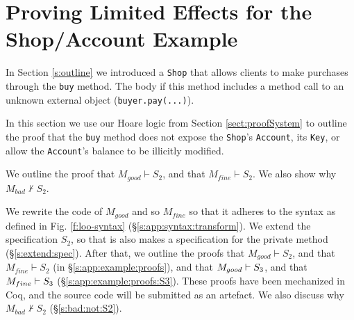 \newcommand{\STwo}{\ensuremath{S_2}}
\newcommand{\STwoStrong}{\ensuremath{S_{2,strong}}}
\newcommand{\SPT}{~ \strut \hspace{.9cm}}
\newcommand{\Alocals}{\prg{A}_{buy}}
\newcommand{\Alocalsb}{\prg{A}_{1}}
\newcommand{\Ids}{\prg{Ids}_{buy}}
\newcommand{\Alocalstr}{\prg{A}_{trns}}
\newcommand{\Idstr}{\prg{Ids}_{trns}}
\newcommand{\Alocalsset}{\prg{A}_{set}}
\newcommand{\Alocalssets}{\prg{A}_{2}}
\newcommand{\Idsset}{\prg{Ids}_{set}}
\newcommand{\stmtsP}{\prg{stmts}_{10,11,12}}
\newcommand{\step}[1]{ \vspace{.1cm} \noindent {\textbf{#1}}}

\section{  {Proving Limited Effects for the Shop/Account Example}}

\label{s:app:example}

In Section \ref{s:outline} we introduced a \verb|Shop| that allows clients to make purchases through the
\verb|buy| method.
The body if this method  includes a method call to an unknown external object (\verb|buyer.pay(...)|).

In this section  we use our Hoare logic from Section \ref{sect:proofSystem} to {outline the proof} that the \verb|buy| method
does not expose the \verb|Shop|'s  \verb|Account|, its \verb|Key|, or allow the \verb|Account|'s balance to be illicitly modified. 

We {outline the proof} that $M_{good} \vdash \STwo$, and that $M_{fine} \vdash \STwo$.
{We  also show why $M_{bad} \not\vdash \STwo$.}

{We   rewrite the code of $M_{good}$ and so $M_{fine}$
so that it adheres to the syntax as defined in Fig. \ref{f:loo-syntax} (\S \ref{s:app:syntax:transform}). 
We  extend the specification $\STwo$, so that is also makes a specification for the private method  (\S \ref{s:extend:spec}). 
After that, we outline the proofs  that $M_{good} \vdash \STwo$, and that $M_{fine} \vdash \STwo$ (in \S \ref{s:app:example:proofs}),
and that  $M_{good} \vdash S_3$, and that $M_{fine} \vdash S_3$ (\S \ref{s:app:example:proofs:S3}).
These proofs have been mechanized in Coq, and the source code will be
submitted as an artefact. %
We also discuss why $M_{bad} \not\vdash \STwo$ (\S \ref{s:bad:not:S2}).}






